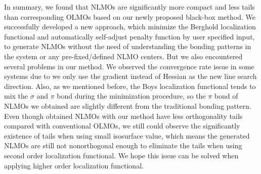 \documentclass[aps,prl,reprint,amsmath,amssymb]{revtex4-1}
\begin{document}
In summary, we found that NLMOs are significantly more compact and less tails than corresponding OLMOs based on our newly proposed black-box method. 
We successfully developed a new approach, which minimize the Berghold localization functional and automatically self-adjust penalty function by user specified input, to generate NLMOs without the need of understanding the bonding patterns in the system or any pre-fixed/defined NLMO centers.
But we also encountered several problems  in our method.
We observed the convergence rate issue in some systems due to we only use the gradient instead of Hessian as the new line search direction.
Also, as we mentioned before, the Boys localization functional tends to mix the $\sigma$ and $\pi$ bond during the minimization procedure, so the $\pi$ bond of NLMOs we obtained are slightly different from the traditional bonding pattern.
Even though obtained NLMOs with our method have less orthogonality tails compared with conventional OLMOs, we still could observe the significantly existence of tails when using small isosurface value, which means the generated NLMOs are still not nonorthogonal enough to eliminate the tails when using second order localization functional. 
We hope this issue can be solved when applying higher order localization functional.
\end{document}
